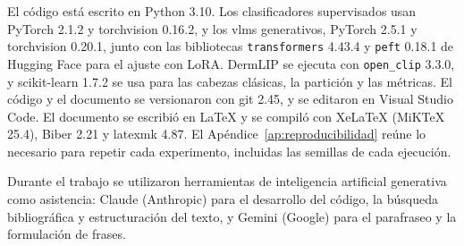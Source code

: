 El código está escrito en Python 3.10. Los clasificadores supervisados usan PyTorch 2.1.2 y torchvision 0.16.2, y los
\glspl{vlm} generativos, PyTorch 2.5.1 y torchvision 0.20.1, junto con las bibliotecas \texttt{transformers} 4.43.4 y
\texttt{peft} 0.18.1 de Hugging Face para el ajuste con LoRA. DermLIP se ejecuta con \texttt{open\_clip} 3.3.0, y
scikit-learn 1.7.2 se usa para las cabezas clásicas, la partición y las métricas. El código y el documento se
versionaron con git 2.45, y se editaron en Visual Studio Code. El documento se escribió en \LaTeX{} y se compiló con
XeLaTeX (MiK\TeX{} 25.4), Biber 2.21 y latexmk 4.87. El Apéndice~\ref{ap:reproducibilidad} reúne lo necesario para
repetir cada experimento, incluidas las semillas de cada ejecución.

Durante el trabajo se utilizaron herramientas de inteligencia artificial generativa como asistencia: Claude (Anthropic)
para el desarrollo del código, la búsqueda bibliográfica y estructuración del texto, y Gemini (Google) para el
parafraseo y la formulación de frases.
